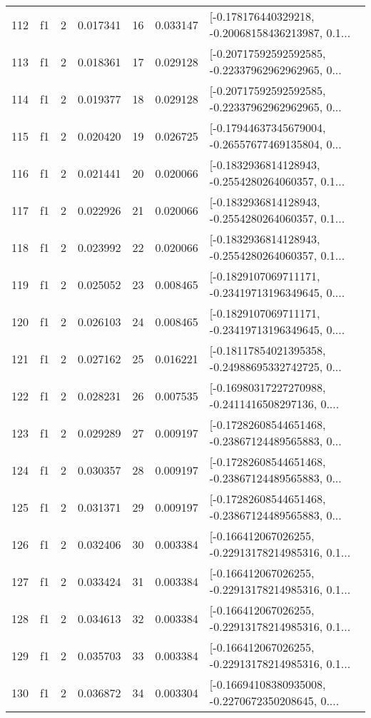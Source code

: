 \begin{tabular}{lllrlrl}
112 &  f1 &   2 &  0.017341 &   16 &  0.033147 &  [-0.178176440329218, -0.20068158436213987, 0.1... \\
113 &  f1 &   2 &  0.018361 &   17 &  0.029128 &  [-0.20717592592592585, -0.22337962962962965, 0... \\
114 &  f1 &   2 &  0.019377 &   18 &  0.029128 &  [-0.20717592592592585, -0.22337962962962965, 0... \\
115 &  f1 &   2 &  0.020420 &   19 &  0.026725 &  [-0.17944637345679004, -0.26557677469135804, 0... \\
116 &  f1 &   2 &  0.021441 &   20 &  0.020066 &  [-0.1832936814128943, -0.2554280264060357, 0.1... \\
117 &  f1 &   2 &  0.022926 &   21 &  0.020066 &  [-0.1832936814128943, -0.2554280264060357, 0.1... \\
118 &  f1 &   2 &  0.023992 &   22 &  0.020066 &  [-0.1832936814128943, -0.2554280264060357, 0.1... \\
119 &  f1 &   2 &  0.025052 &   23 &  0.008465 &  [-0.1829107069711171, -0.23419713196349645, 0.... \\
120 &  f1 &   2 &  0.026103 &   24 &  0.008465 &  [-0.1829107069711171, -0.23419713196349645, 0.... \\
121 &  f1 &   2 &  0.027162 &   25 &  0.016221 &  [-0.18117854021395358, -0.24988695332742725, 0... \\
122 &  f1 &   2 &  0.028231 &   26 &  0.007535 &  [-0.16980317227270988, -0.2411416508297136, 0.... \\
123 &  f1 &   2 &  0.029289 &   27 &  0.009197 &  [-0.17282608544651468, -0.23867124489565883, 0... \\
124 &  f1 &   2 &  0.030357 &   28 &  0.009197 &  [-0.17282608544651468, -0.23867124489565883, 0... \\
125 &  f1 &   2 &  0.031371 &   29 &  0.009197 &  [-0.17282608544651468, -0.23867124489565883, 0... \\
126 &  f1 &   2 &  0.032406 &   30 &  0.003384 &  [-0.166412067026255, -0.22913178214985316, 0.1... \\
127 &  f1 &   2 &  0.033424 &   31 &  0.003384 &  [-0.166412067026255, -0.22913178214985316, 0.1... \\
128 &  f1 &   2 &  0.034613 &   32 &  0.003384 &  [-0.166412067026255, -0.22913178214985316, 0.1... \\
129 &  f1 &   2 &  0.035703 &   33 &  0.003384 &  [-0.166412067026255, -0.22913178214985316, 0.1... \\
130 &  f1 &   2 &  0.036872 &   34 &  0.003304 &  [-0.16694108380935008, -0.2270672350208645, 0.... \\

\end{tabular}
